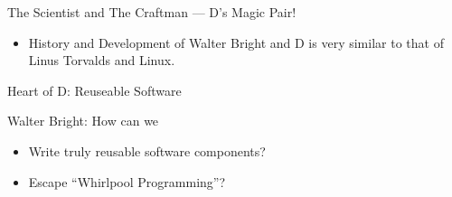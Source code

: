 \documentclass[xcolor=dvipsnames]{beamer}
\begin{document}
\begin{frame}[fragile]{The Scientist and The Craftman --- D's Magic Pair!}
  \begin{figure}
  \end{figure}
 \pause{}
  \begin{itemize}[<+->]
  \item History and Development of Walter Bright and D is very similar to that
    of Linus Torvalds and Linux.
  \end{itemize}
\end{frame}

\begin{frame}[fragile]{Heart of D: Reuseable Software}
  \begin{figure}
  \end{figure}
 Walter Bright: How can we
 \pause{}
  \begin{itemize}[<+->]
  \item Write truly reusable software components?
  \item Escape ``Whirlpool Programming''?
  \end{itemize}
\end{frame}
\end{document}
